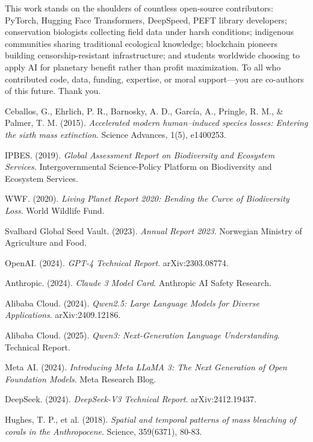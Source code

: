 \documentclass[twocolumn,11pt]{article}
\begin{document}
This work stands on the shoulders of countless open-source contributors: PyTorch, Hugging Face Transformers, DeepSpeed, PEFT library developers; conservation biologists collecting field data under harsh conditions; indigenous communities sharing traditional ecological knowledge; blockchain pioneers building censorship-resistant infrastructure; and students worldwide choosing to apply AI for planetary benefit rather than profit maximization. To all who contributed code, data, funding, expertise, or moral support—you are co-authors of this future. Thank you.


\begin{thebibliography}{99}

Ceballos, G., Ehrlich, P. R., Barnosky, A. D., García, A., Pringle, R. M., \& Palmer, T. M. (2015).
\textit{Accelerated modern human–induced species losses: Entering the sixth mass extinction}.
Science Advances, 1(5), e1400253.

IPBES. (2019).
\textit{Global Assessment Report on Biodiversity and Ecosystem Services}.
Intergovernmental Science-Policy Platform on Biodiversity and Ecosystem Services.

WWF. (2020).
\textit{Living Planet Report 2020: Bending the Curve of Biodiversity Loss}.
World Wildlife Fund.

Svalbard Global Seed Vault. (2023).
\textit{Annual Report 2023}.
Norwegian Ministry of Agriculture and Food.

OpenAI. (2024).
\textit{GPT-4 Technical Report}.
arXiv:2303.08774.

Anthropic. (2024).
\textit{Claude 3 Model Card}.
Anthropic AI Safety Research.

Alibaba Cloud. (2024).
\textit{Qwen2.5: Large Language Models for Diverse Applications}.
arXiv:2409.12186.

Alibaba Cloud. (2025).
\textit{Qwen3: Next-Generation Language Understanding}.
Technical Report.

Meta AI. (2024).
\textit{Introducing Meta LLaMA 3: The Next Generation of Open Foundation Models}.
Meta Research Blog.

DeepSeek. (2024).
\textit{DeepSeek-V3 Technical Report}.
arXiv:2412.19437.

Hughes, T. P., et al. (2018).
\textit{Spatial and temporal patterns of mass bleaching of corals in the Anthropocene}.
Science, 359(6371), 80-83.


\end{thebibliography}
\end{document}
